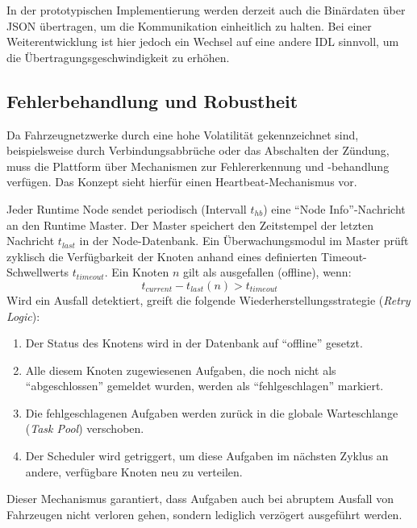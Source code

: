 In der prototypischen Implementierung werden derzeit auch die Binärdaten über \gls{JSON} übertragen, um die Kommunikation einheitlich zu halten. Bei einer Weiterentwicklung ist hier jedoch ein Wechsel auf eine andere \gls{IDL} sinnvoll, um die Übertragungsgeschwindigkeit zu erhöhen.

\subsection{Fehlerbehandlung und Robustheit}
\label{sec:Fehlerbehandlung}

Da Fahrzeugnetzwerke durch eine hohe Volatilität gekennzeichnet sind, beispielsweise durch Verbindungsabbrüche oder das Abschalten der Zündung, muss die Plattform über Mechanismen zur Fehlererkennung und -behandlung verfügen. Das Konzept sieht hierfür einen Heartbeat-Mechanismus vor.

Jeder Runtime Node sendet periodisch (Intervall $t_{hb}$) eine \enquote{Node Info}-Nachricht an den Runtime Master. Der Master speichert den Zeitstempel der letzten Nachricht $t_{last}$ in der Node-Datenbank. Ein Überwachungsmodul im Master prüft zyklisch die Verfügbarkeit der Knoten anhand eines definierten Timeout-Schwellwerts $t_{timeout}$. Ein Knoten $n$ gilt als ausgefallen (offline), wenn:
\begin{equation}
    t_{current} - t_{last}(n) > t_{timeout}
\end{equation}
Wird ein Ausfall detektiert, greift die folgende Wiederherstellungsstrategie (\textit{Retry Logic}):
\begin{enumerate}
    \item Der Status des Knotens wird in der Datenbank auf \enquote{offline} gesetzt.
    \item Alle diesem Knoten zugewiesenen Aufgaben, die noch nicht als \enquote{abgeschlossen} gemeldet wurden, werden als \enquote{fehlgeschlagen} markiert.
    \item Die fehlgeschlagenen Aufgaben werden zurück in die globale Warteschlange (\textit{Task Pool}) verschoben.
    \item Der Scheduler wird getriggert, um diese Aufgaben im nächsten Zyklus an andere, verfügbare Knoten neu zu verteilen.
\end{enumerate}
Dieser Mechanismus garantiert, dass Aufgaben auch bei abruptem Ausfall von Fahrzeugen nicht verloren gehen, sondern lediglich verzögert ausgeführt werden.

